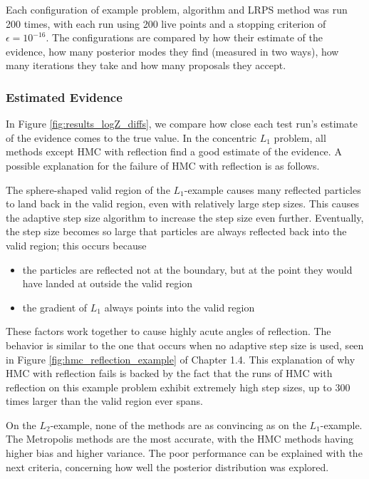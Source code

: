 \documentclass[12pt, a4paper]{report}
\begin{document}
Each configuration of example problem, algorithm and LRPS method was run 200 times, with each run using 200 live points and a stopping criterion of $\epsilon = 10^{-16}$.
The configurations are compared by how their estimate of the evidence, how many posterior modes they find (measured in two ways), how many iterations they take and how many proposals they accept.

\subsubsection{Estimated Evidence}
In Figure \ref{fig:results_logZ_diffs}, we compare how close each test run's estimate of the evidence comes to the true value.
In the concentric $L_1$ problem, all methods except HMC with reflection find a good estimate of the evidence.
A possible explanation for the failure of HMC with reflection is as follows.

The sphere-shaped valid region of the $L_1$-example causes many reflected particles to land back in the valid region, even with relatively large step sizes.
This causes the adaptive step size algorithm to increase the step size even further.
Eventually, the step size becomes so large that particles are always reflected back into the valid region; this occurs because
\begin{itemize}
    \item the particles are reflected not at the boundary, but at the point they would have landed at outside the valid region
    \item the gradient of $L_1$ always points into the valid region
\end{itemize}
These factors work together to cause highly acute angles of reflection.
The behavior is similar to the one that occurs when no adaptive step size is used, seen in Figure \ref{fig:hmc_reflection_example} of Chapter 1.4.
This explanation of why HMC with reflection fails is backed by the fact that the runs of HMC with reflection on this example problem exhibit extremely high step sizes, up to 300 times larger than the valid region ever spans.

On the $L_2$-example, none of the methods are as convincing as on the $L_1$-example.
The Metropolis methods are the most accurate, with the HMC methods having higher bias and higher variance.
The poor performance can be explained with the next criteria, concerning how well the posterior distribution was explored.
\end{document}
